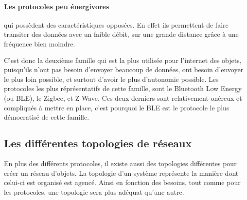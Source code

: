 \paragraph{Les protocoles peu énergivores}qui possèdent des caractéristiques opposées. En effet ils 
permettent de faire transiter des données avec un faible débit, sur une grande distance grâce à une fréquence 
bien moindre.

C'est donc la deuxième famille qui est la plus utilisée pour l'internet des objets, puisqu'ils n'ont pas 
besoin d'envoyer beaucoup de données, ont besoin d'envoyer le plus loin possible, et surtout d'avoir le plus 
d'autonomie possible. Les protocoles les plus réprésentatifs de cette famille, sont le Bluetooth Low Energy 
(ou BLE), le Zigbee, et Z-Wave. Ces deux derniers sont relativement onéreux et compliqués à mettre en place, 
c'est pourquoi le BLE est le protocole le plus démocratisé de cette famille.

	\subsection{Les différentes topologies de réseaux}
En plus des différents protocoles, il existe aussi des topologies différentes pour créer un réseau d'objets. 
La topologie d'un système représente la manière dont celui-ci est organisé est agencé. Ainsi en fonction des 
besoins, tout comme pour les protocoles, une topologie sera plus adéquat qu'une autre.

